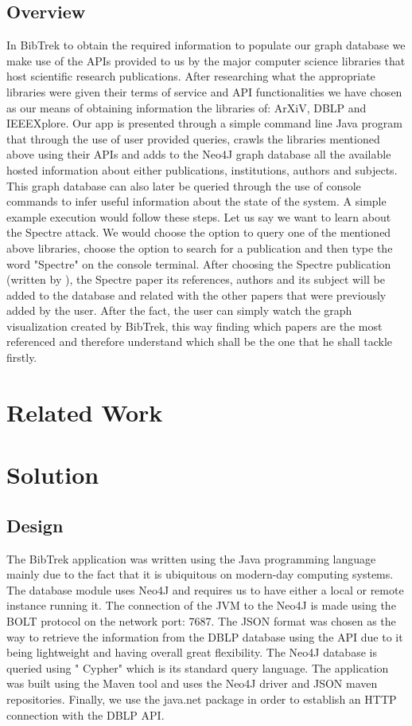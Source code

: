 \documentclass{article}
\begin{document}
\subsection{Overview}
In BibTrek to obtain the required information to populate our graph database we make use of the APIs provided to us by the major computer science libraries that host scientific research publications. After researching what the appropriate libraries were given their terms of service and API functionalities we have chosen as our means of obtaining information the libraries of: ArXiV, DBLP and IEEEXplore. Our app is presented through a simple command line Java program that through the use of user provided queries, crawls the libraries mentioned above using their APIs and adds to the Neo4J graph database all the available hosted information about either publications, institutions, authors and subjects. This graph database can also later be queried through the use of console commands to infer useful information about the state of the system. A simple example execution would follow these steps. Let us say we want to learn about the Spectre attack. We would choose the option to query one of the mentioned above libraries, choose the option to search for a publication and then type the word "Spectre" on the console terminal. After choosing the Spectre publication (written by ), the Spectre paper its references, authors and its subject will be added to the database and related with the other papers that were previously added by the user. After the fact, the user can simply watch the graph visualization created by BibTrek, this way finding which papers are the most referenced and therefore understand which shall be the one that he shall tackle firstly.

\section{Related Work}

\section{Solution}
\subsection{Design}
The BibTrek application was written using the Java programming language mainly due to the fact that it is ubiquitous on modern-day computing systems. The database module uses Neo4J and requires us to have either a local or remote instance running it. The connection of the JVM to the Neo4J is made using the BOLT protocol on the network port: 7687. The JSON format was chosen as the way to retrieve the information from the DBLP database using the API due to it being lightweight and having overall great flexibility. The Neo4J database is queried using "
Cypher" which is its standard query language. The application was built using the Maven tool and uses the Neo4J driver and JSON maven repositories. Finally, we use the java.net package in order to establish an HTTP connection with the DBLP API.
\end{document}
